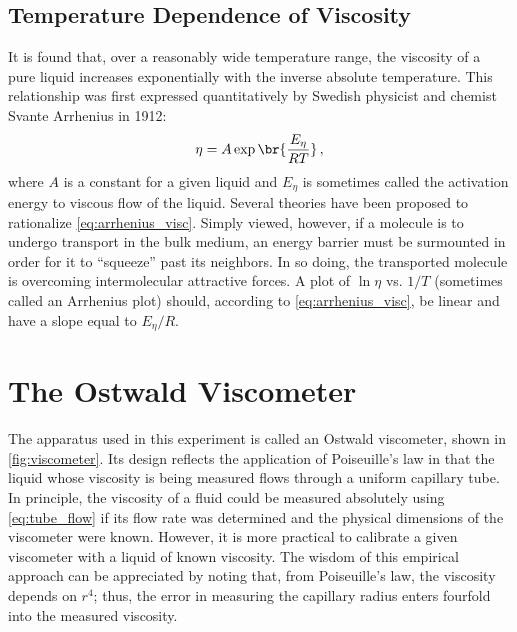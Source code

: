 \subsection{Temperature Dependence of Viscosity} %
\label{sub:temperature_dependence_of_viscosity}

It is found that, over a reasonably wide temperature range, the viscosity of a pure liquid increases exponentially with the inverse absolute temperature.
This relationship was first expressed quantitatively by Swedish physicist and chemist Svante Arrhenius in 1912:
\begin{equation}
	\eta = A \exp\br{\frac{E_\eta}{R T}} \, ,
	\label{eq:arrhenius_visc}
\end{equation}
where \( A \) is a constant for a given liquid and \( E_\eta \) is sometimes called the activation energy to viscous flow of the liquid.
Several theories have been proposed to rationalize \cref{eq:arrhenius_visc}.
Simply viewed, however, if a molecule is to undergo transport in the bulk medium, an energy barrier must be surmounted in order for it to ``squeeze'' past its neighbors.
In so doing, the transported molecule is overcoming intermolecular attractive forces.
A plot of \( \ln{\eta} \) vs. \( 1/T \) (sometimes called an Arrhenius plot) should, according to \cref{eq:arrhenius_visc}, be linear and have a slope equal to \( E_\eta / R \).



\section{The Ostwald Viscometer} %
\label{sec:the_ostwald_viscometer}

The apparatus used in this experiment is called an Ostwald viscometer, shown in \cref{fig:viscometer}. 
Its design reflects the application of Poiseuille's law in that the liquid whose viscosity is being measured flows through a uniform capillary tube. 
In principle, the viscosity of a fluid could be measured absolutely using \cref{eq:tube_flow} if its flow rate was determined and the physical dimensions of the viscometer were known. 
However, it is more practical to calibrate a given viscometer with a liquid of known viscosity. 
The wisdom of this empirical approach can be appreciated by noting that, from Poiseuille's law, the viscosity depends on \( r^4 \); thus, the error in measuring the capillary radius enters fourfold into the measured viscosity.

